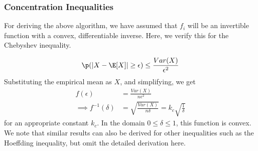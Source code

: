 \subsubsection{Concentration Inequalities}
For deriving the above algorithm, we have assumed that $f_i$ will be an invertible function with a convex, differentiable inverse. 
Here, we verify this for the Chebyshev inequality. 

\begin{align*}
    \p(|X-\E[X]| \geq \epsilon) \leq \frac{Var(X)}{\epsilon^2}
\end{align*}
Substituting the empirical mean as $X$, and simplifying, we get 
\begin{align*}
    f(\epsilon) &= \frac{Var(X)}{n\epsilon^2}\\
\implies f^{-1}(\delta) &= \sqrt{\frac{Var(X)}{n\delta}} = k_c\sqrt{\frac{1}{\delta}}
\end{align*}
for an appropriate constant $k_c$. In the domain $0\leq\delta\leq 1$, this function is convex.
We note that similar results can also be derived for other inequalities such as the Hoeffding inequality, but omit the detailed derivation here. 





 \begin{comment}
 \subsection{Implementation}
 \label{sec:specification:implementation}
 Short section on how the grammar is implemented based on the text in comments.tex with additional details about DB/Pandas
 \end{comment}